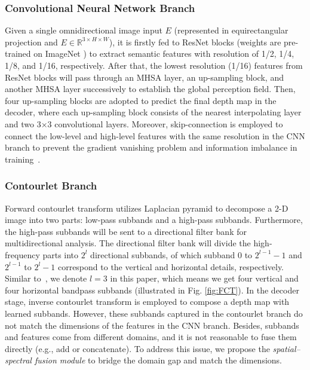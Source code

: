 \documentclass[10pt,times,mathptm,psfig,twocolumn,journals]{IEEEtran}
\begin{document}
\subsubsection{Convolutional Neural Network Branch }
\label{CNNbranch}
Given a single omnidirectional image input $E$ (represented in equirectangular projection and $E \in \mathbb{R}^{3\times H \times W}$), it is firstly fed to ResNet \cite{he2016identity} blocks (weights are pre-trained on ImageNet \cite{he2019rethinking}) to extract semantic features with resolution of 1/2, 1/4, 1/8, and 1/16, respectively. After that, the lowest resolution (1/16) features from ResNet blocks will pass through an MHSA layer, an up-sampling block, and another MHSA layer \cite{wang2018non} successively to establish the global perception field. Then, four up-sampling blocks are adopted to predict the final depth map in the decoder, where each up-sampling block \cite{ramamonjisoa2021single, huang2018condensenet} consists of the nearest interpolating layer and two 3×3 convolutional layers.
Moreover, skip-connection is employed to connect the low-level and high-level features with the same resolution in the CNN branch to prevent the gradient vanishing problem and information imbalance in training~\cite{ronneberger2015u}. \subsubsection{Contourlet Branch}
\label{contourletbranch}
Forward contourlet transform utilizes Laplacian pyramid to decompose a 2-D image into two parts: low-pass subbands and a high-pass subbands. Furthermore, the high-pass subbands will be sent to a directional filter bank for multidirectional analysis.  The directional filter bank will divide the high-frequency parts into $2^{l}$ directional subbands, of which subband $0$ to $2^{l-1}-1$ and $2^{l-1}$ to $2^{l}-1$ correspond to the vertical and horizontal details, respectively. Similar to~\cite{MengkunLiu2021CCNNCC}, we denote $l = 3$ in this paper, which means we get four vertical and four horizontal bandpass subbands (illustrated in Fig. \ref{fig:FCT}). In the decoder stage, inverse contourlet transform is employed to compose a depth map with learned subbands. However, these subbands captured in the contourlet branch do not match the dimensions of the features in the CNN branch. Besides, subbands and features come from different domains, and it is not reasonable to fuse them directly (e.g., add or concatenate). To address this issue, we propose the \textit{spatial–spectral fusion module} to bridge the domain gap and match the dimensions.
\end{document}
